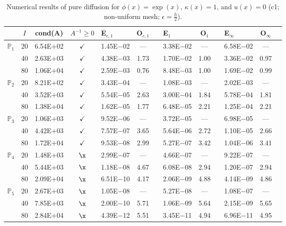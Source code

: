 \begin{table}[H]
\centering
\caption{Numerical results of pure diffusion for $\phi(x)=\exp(x)$, $\kappa(x)=1$, and $u(x)=0$ (c1; non-uniform mesh; $\epsilon=\frac{h}{2}$).}
\begin{tabular}{@{}l c c c l c c l c c l c c@{}}
\toprule
 & $I$ & cond(A) & $A^{-1}\geq 0$ &  E$_{c,1}$ & O$_{c,1}$ && E$_1$ & O$_1$ && E$_{\infty}$ & O$_{\infty}$\\
\midrule
\multirow{3}{*}{$\mathbb{P}_{1}$}
 & 20 & 6.54E$+$02 & $\checkmark$ & 1.45E$-$02 & --- && 3.38E$-$02 & --- && 6.58E$-$02 & ---\\
 & 40 & 2.63E$+$03 & $\checkmark$ & 4.38E$-$03 & 1.73 && 1.70E$-$02 & 1.00 && 3.36E$-$02 & 0.97\\
 & 80 & 1.06E$+$04 & $\checkmark$ & 2.59E$-$03 & 0.76 && 8.48E$-$03 & 1.00 && 1.69E$-$02 & 0.99\\
\midrule
\multirow{3}{*}{$\mathbb{P}_{2}$}
 & 20 & 8.21E$+$02 & $\checkmark$ & 3.43E$-$04 & --- && 1.08E$-$03 & --- && 2.02E$-$03 & ---\\
 & 40 & 3.52E$+$03 & $\checkmark$ & 5.54E$-$05 & 2.63 && 3.00E$-$04 & 1.84 && 5.78E$-$04 & 1.81\\
 & 80 & 1.38E$+$04 & $\checkmark$ & 1.62E$-$05 & 1.77 && 6.48E$-$05 & 2.21 && 1.25E$-$04 & 2.21\\
\midrule
\multirow{3}{*}{$\mathbb{P}_{3}$}
 & 20 & 1.06E$+$03 & $\checkmark$ & 9.52E$-$06 & --- && 3.72E$-$05 & --- && 6.98E$-$05 & ---\\
 & 40 & 4.42E$+$03 & $\checkmark$ & 7.57E$-$07 & 3.65 && 5.64E$-$06 & 2.72 && 1.10E$-$05 & 2.66\\
 & 80 & 1.72E$+$04 & $\checkmark$ & 9.53E$-$08 & 2.99 && 5.27E$-$07 & 3.42 && 1.04E$-$06 & 3.41\\
\midrule
\multirow{3}{*}{$\mathbb{P}_{4}$}
 & 20 & 1.48E$+$03 & $\x$ & 2.99E$-$07 & --- && 4.66E$-$07 & --- && 9.22E$-$07 & ---\\
 & 40 & 5.44E$+$03 & $\x$ & 1.18E$-$08 & 4.67 && 6.08E$-$08 & 2.94 && 1.20E$-$07 & 2.94\\
 & 80 & 2.09E$+$04 & $\x$ & 6.51E$-$10 & 4.17 && 2.06E$-$09 & 4.88 && 4.14E$-$09 & 4.86\\
\midrule
\multirow{3}{*}{$\mathbb{P}_{5}$}
 & 20 & 2.67E$+$03 & $\x$ & 1.05E$-$08 & --- && 5.27E$-$08 & --- && 1.08E$-$07 & ---\\
 & 40 & 7.85E$+$03 & $\x$ & 2.00E$-$10 & 5.71 && 1.06E$-$09 & 5.64 && 2.15E$-$09 & 5.65\\
 & 80 & 2.84E$+$04 & $\x$ & 4.39E$-$12 & 5.51 && 3.45E$-$11 & 4.94 && 6.96E$-$11 & 4.95\\
\bottomrule
\end{tabular}
\end{table}